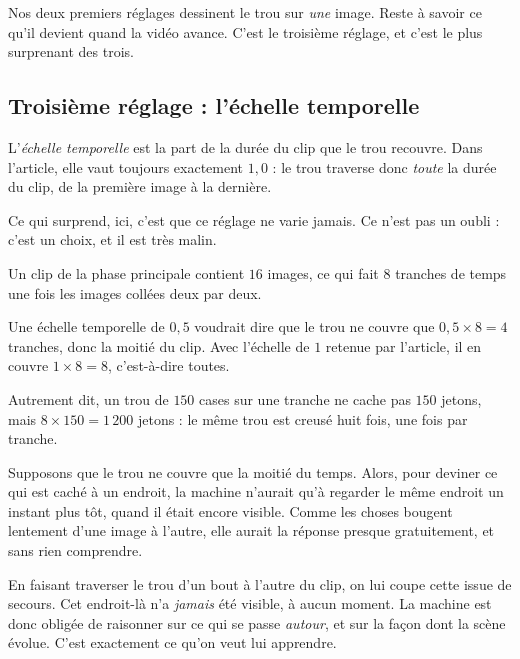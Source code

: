 Nos deux premiers réglages dessinent le trou sur \emph{une} image. Reste à
savoir ce qu'il devient quand la vidéo avance. C'est le troisième réglage,
et c'est le plus surprenant des trois.

\subsection*{Troisième réglage : l'échelle temporelle}

\begin{definition}
L'\emph{échelle temporelle} est la part de la durée du clip que le trou
recouvre. Dans l'article, elle vaut toujours exactement $1{,}0$ : le trou
traverse donc \emph{toute} la durée du clip, de la première image à la
dernière.
\end{definition}

Ce qui surprend, ici, c'est que ce réglage ne varie jamais. Ce n'est pas un
oubli : c'est un choix, et il est très malin.

\begin{exemple}
Un clip de la phase principale contient $16$ images, ce qui fait $8$
tranches de temps une fois les images collées deux par deux.

Une échelle temporelle de $0{,}5$ voudrait dire que le trou ne couvre que
$0{,}5 \times 8 = 4$ tranches, donc la moitié du clip. Avec l'échelle de $1$
retenue par l'article, il en couvre $1 \times 8 = 8$, c'est-à-dire toutes.

Autrement dit, un trou de $150$ cases sur une tranche ne cache pas $150$
jetons, mais $8 \times 150 = 1\,200$ jetons : le même trou est creusé huit
fois, une fois par tranche.
\end{exemple}

\begin{intuition}
Supposons que le trou ne couvre que la moitié du temps. Alors, pour deviner
ce qui est caché à un endroit, la machine n'aurait qu'à regarder le même
endroit un instant plus tôt, quand il était encore visible. Comme les choses
bougent lentement d'une image à l'autre, elle aurait la réponse presque
gratuitement, et sans rien comprendre.

En faisant traverser le trou d'un bout à l'autre du clip, on lui coupe cette
issue de secours. Cet endroit-là n'a \emph{jamais} été visible, à aucun
moment. La machine est donc obligée de raisonner sur ce qui se passe
\emph{autour}, et sur la façon dont la scène évolue. C'est exactement ce
qu'on veut lui apprendre.
\end{intuition}

